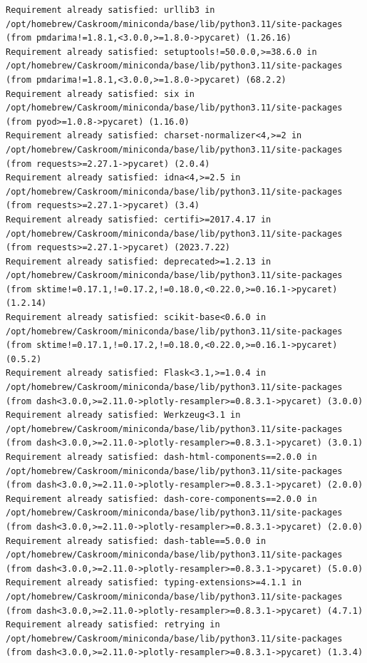 \documentclass[
  letterpaper,
  DIV=11,
  numbers=noendperiod]{scrartcl}
\begin{document}
\begin{verbatim}
Requirement already satisfied: urllib3 in /opt/homebrew/Caskroom/miniconda/base/lib/python3.11/site-packages (from pmdarima!=1.8.1,<3.0.0,>=1.8.0->pycaret) (1.26.16)
Requirement already satisfied: setuptools!=50.0.0,>=38.6.0 in /opt/homebrew/Caskroom/miniconda/base/lib/python3.11/site-packages (from pmdarima!=1.8.1,<3.0.0,>=1.8.0->pycaret) (68.2.2)
Requirement already satisfied: six in /opt/homebrew/Caskroom/miniconda/base/lib/python3.11/site-packages (from pyod>=1.0.8->pycaret) (1.16.0)
Requirement already satisfied: charset-normalizer<4,>=2 in /opt/homebrew/Caskroom/miniconda/base/lib/python3.11/site-packages (from requests>=2.27.1->pycaret) (2.0.4)
Requirement already satisfied: idna<4,>=2.5 in /opt/homebrew/Caskroom/miniconda/base/lib/python3.11/site-packages (from requests>=2.27.1->pycaret) (3.4)
Requirement already satisfied: certifi>=2017.4.17 in /opt/homebrew/Caskroom/miniconda/base/lib/python3.11/site-packages (from requests>=2.27.1->pycaret) (2023.7.22)
Requirement already satisfied: deprecated>=1.2.13 in /opt/homebrew/Caskroom/miniconda/base/lib/python3.11/site-packages (from sktime!=0.17.1,!=0.17.2,!=0.18.0,<0.22.0,>=0.16.1->pycaret) (1.2.14)
Requirement already satisfied: scikit-base<0.6.0 in /opt/homebrew/Caskroom/miniconda/base/lib/python3.11/site-packages (from sktime!=0.17.1,!=0.17.2,!=0.18.0,<0.22.0,>=0.16.1->pycaret) (0.5.2)
Requirement already satisfied: Flask<3.1,>=1.0.4 in /opt/homebrew/Caskroom/miniconda/base/lib/python3.11/site-packages (from dash<3.0.0,>=2.11.0->plotly-resampler>=0.8.3.1->pycaret) (3.0.0)
Requirement already satisfied: Werkzeug<3.1 in /opt/homebrew/Caskroom/miniconda/base/lib/python3.11/site-packages (from dash<3.0.0,>=2.11.0->plotly-resampler>=0.8.3.1->pycaret) (3.0.1)
Requirement already satisfied: dash-html-components==2.0.0 in /opt/homebrew/Caskroom/miniconda/base/lib/python3.11/site-packages (from dash<3.0.0,>=2.11.0->plotly-resampler>=0.8.3.1->pycaret) (2.0.0)
Requirement already satisfied: dash-core-components==2.0.0 in /opt/homebrew/Caskroom/miniconda/base/lib/python3.11/site-packages (from dash<3.0.0,>=2.11.0->plotly-resampler>=0.8.3.1->pycaret) (2.0.0)
Requirement already satisfied: dash-table==5.0.0 in /opt/homebrew/Caskroom/miniconda/base/lib/python3.11/site-packages (from dash<3.0.0,>=2.11.0->plotly-resampler>=0.8.3.1->pycaret) (5.0.0)
Requirement already satisfied: typing-extensions>=4.1.1 in /opt/homebrew/Caskroom/miniconda/base/lib/python3.11/site-packages (from dash<3.0.0,>=2.11.0->plotly-resampler>=0.8.3.1->pycaret) (4.7.1)
Requirement already satisfied: retrying in /opt/homebrew/Caskroom/miniconda/base/lib/python3.11/site-packages (from dash<3.0.0,>=2.11.0->plotly-resampler>=0.8.3.1->pycaret) (1.3.4)

\end{verbatim}
\end{document}
